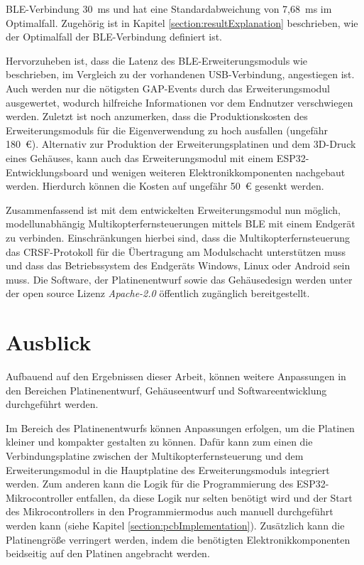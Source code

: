 \ac{BLE}-Verbindung 30~ms und hat eine Standardabweichung von 7,68~ms im Optimalfall. Zugehörig ist in Kapitel \ref{section:resultExplanation} beschrieben, wie der Optimalfall der \ac{BLE}-Verbindung definiert ist.

Hervorzuheben ist, dass die Latenz des \ac{BLE}-Erweiterungsmoduls wie beschrieben, im Vergleich zu der vorhandenen USB-Verbindung, angestiegen ist. Auch werden nur die nötigsten \ac{GAP}-Events durch das Erweiterungsmodul ausgewertet, wodurch hilfreiche Informationen vor dem Endnutzer verschwiegen werden. Zuletzt ist noch anzumerken, dass die Produktionskosten des Erweiterungsmoduls für die Eigenverwendung zu hoch ausfallen (ungefähr 180~€). Alternativ zur Produktion der Erweiterungsplatinen und dem 3D-Druck eines Gehäuses, kann auch das Erweiterungsmodul mit einem ESP32-Entwicklungsboard und wenigen weiteren Elektronikkomponenten nachgebaut werden. Hierdurch können die Kosten auf ungefähr 50~€ gesenkt werden. 

Zusammenfassend ist mit dem entwickelten Erweiterungsmodul nun möglich, modellunabhängig Multikopterfernsteuerungen mittels \ac{BLE} mit einem Endgerät zu verbinden. Einschränkungen hierbei sind, dass die Multikopterfernsteuerung das CRSF-Protokoll für die Übertragung am Modulschacht unterstützen muss und dass das Betriebssystem des Endgeräts Windows, Linux oder Android sein muss. Die Software, der Platinenentwurf sowie das Gehäusedesign werden unter der open source Lizenz \textit{Apache-2.0} öffentlich zugänglich bereitgestellt.

\section{Ausblick}
Aufbauend auf den Ergebnissen dieser Arbeit, können weitere Anpassungen in den Bereichen Platinenentwurf, Gehäuseentwurf und Softwareentwicklung durchgeführt werden.

Im Bereich des Platinenentwurfs können Anpassungen erfolgen, um die Platinen kleiner und kompakter gestalten zu können. Dafür kann zum einen die Verbindungsplatine zwischen der Multikopterfernsteuerung und dem Erweiterungsmodul in die Hauptplatine des Erweiterungsmoduls integriert werden. Zum anderen kann die Logik für die Programmierung des ESP32-Mikrocontroller entfallen, da diese Logik nur selten benötigt wird und der Start des Mikrocontrollers in den Programmiermodus auch manuell durchgeführt werden kann (siehe Kapitel \ref{section:pcbImplementation}). Zusätzlich kann die Platinengröße verringert werden, indem die benötigten Elektronikkomponenten beidseitig auf den Platinen angebracht werden.

